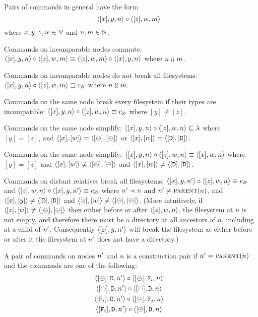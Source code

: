 
\bigskip

\noindent
Pairs of commands in general have the form
\[ \cxynv\cc  \czwmv \]
where $x,y,z,w\in\setv$ and $n,m\in\setn$. 

\begin{myax}\label{ax_separate_commute}
Commands on incomparable nodes commute:
$\cxynv\cc\czwmv \equiv \czwmv\cc\cxynv$ where $n\unrel m$.
\end{myax}

\begin{myax}\label{ax_separate_nobreaks}
Commands on incomparable nodes do not break all filesystems:
$\wrksx{\cxynv\cc\czwmv}$ where $n\unrel m$.
\end{myax}

\begin{myax}\label{ax_same_breaks}
Commands on the same node break every filesystem if their types are incompatible:
$\cxynv\cc\czwnv \equiv \cbrk$ where $[y]\ne [z]$.
\end{myax}

\begin{myax}\label{ax_same_emptyseq}
Commands on the same node simplify:
$\cxynv\cc\czwnv \eqext \emptyseq$ where $[y]=[z]$, and $\cxw=\cbb$ 
or $\cxw=\cdd$.
\end{myax}

\begin{myax}\label{ax_same_singlec}
Commands on the same node simplify:
$\cxynv\cc \czwnv \equiv \cxwnv$ where $[y]=[z]$ and $\cxw\neq\cbb$ and $\cxw\neq\cdd$.
\end{myax}

\begin{myax}\label{ax_distantrel_breaks}
Commands on distant relatives break all filesystems:
$\cxynnv\cc\czwnv \equiv \cbrk$
and $\czwnv\cc\cxynnv \equiv\cbrk$
where $\nn\descendant n$ and $\nn\neq\parent(n)$, and $\cxy\neq\cdd$ and $\czw\neq\cbb$.
(More intuitively, if $\czw\neq\cbb$ then either before or after $\czwnv$, the filesystem at
$n$ is not empty, and therefore there must be a directory at all ancestors of $n$, including at a child of $\nn$.
Consequently $\cxynnv$ will break the filesystem as either before or after it the filesystem at $\nn$
does not have a directory.)
\end{myax}

\begin{mydef}
A pair of commands on nodes $\nn$ and $n$ is a construction pair if $\nn=\parent(n)$ 
and the commands are one
of the following:
   \begin{gather*}
            \cbdaa{\nn}\cc  \cbfaa{n} \\
            \cbdaa{\nn}\cc  \cbdaa{n} \\
            \cfdaa{\nn}\cc  \caaa{\empt}{\valff}{n} \\
            \cfdaa{\nn}\cc  \cbdaa{n}
   \end{gather*}
\end{mydef}


